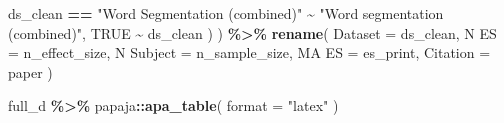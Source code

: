 \documentclass[
]{article}
\newenvironment{Shaded}{\begin{snugshade}}{\end{snugshade}}
\newcommand{\AttributeTok}[1]{\textcolor[rgb]{0.13,0.29,0.53}{#1}}
\newcommand{\ConstantTok}[1]{\textcolor[rgb]{0.56,0.35,0.01}{#1}}
\newcommand{\FunctionTok}[1]{\textcolor[rgb]{0.13,0.29,0.53}{\textbf{#1}}}
\newcommand{\NormalTok}[1]{#1}
\newcommand{\OtherTok}[1]{\textcolor[rgb]{0.56,0.35,0.01}{#1}}
\newcommand{\SpecialCharTok}[1]{\textcolor[rgb]{0.81,0.36,0.00}{\textbf{#1}}}
\newcommand{\StringTok}[1]{\textcolor[rgb]{0.31,0.60,0.02}{#1}}
\begin{document}
\begin{Shaded}
\begin{Highlighting}[]
\NormalTok{      ds\_clean }\SpecialCharTok{==} \StringTok{"Word Segmentation (combined)"} \SpecialCharTok{\textasciitilde{}} \StringTok{"Word segmentation (combined)"}\NormalTok{, }
      \ConstantTok{TRUE} \SpecialCharTok{\textasciitilde{}}\NormalTok{ ds\_clean}
\NormalTok{    )}
\NormalTok{  ) }\SpecialCharTok{\%\textgreater{}\%} 
  \FunctionTok{rename}\NormalTok{(}
    \AttributeTok{Dataset =}\NormalTok{ ds\_clean, }
    \StringTok{\textquotesingle{}N ES\textquotesingle{}} \OtherTok{=}\NormalTok{ n\_effect\_size, }
    \StringTok{\textquotesingle{}N Subject\textquotesingle{}} \OtherTok{=}\NormalTok{ n\_sample\_size, }
    \StringTok{\textquotesingle{}MA ES\textquotesingle{}} \OtherTok{=}\NormalTok{ es\_print, }
    \StringTok{\textquotesingle{}Citation\textquotesingle{}} \OtherTok{=}\NormalTok{ paper}
\NormalTok{  )}
\end{Highlighting}
\end{Shaded}

\begin{Shaded}
\begin{Highlighting}[]
\NormalTok{full\_d }\SpecialCharTok{\%\textgreater{}\%}\NormalTok{ papaja}\SpecialCharTok{::}\FunctionTok{apa\_table}\NormalTok{(}
  \AttributeTok{format =} \StringTok{"latex"}
\NormalTok{)}
\end{Highlighting}
\end{Shaded}
\end{document}
